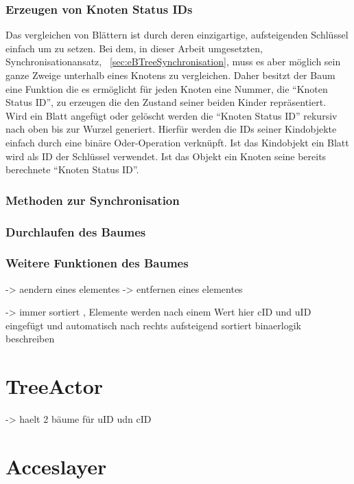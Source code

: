 \documentclass[a4paper,11pt,oneside,%
headsepline,												%
footsepline,												%
bibtotocnumbered									%
]{scrreprt}
\begin{document}
\subsubsection{Erzeugen von Knoten Status IDs}
Das vergleichen von Blättern ist durch deren einzigartige, aufsteigenden Schlüssel einfach um zu setzen. Bei dem, in dieser Arbeit umgesetzten, Synchronisationansatz, ~\autoref{sec:eBTreeSynchronisation}, muss es aber möglich sein ganze Zweige unterhalb eines Knotens zu vergleichen. Daher besitzt der Baum eine Funktion die es ermöglicht für jeden Knoten eine Nummer, die \enquote{Knoten Status ID}, zu erzeugen die den Zustand seiner beiden Kinder repräsentiert.\\

Wird ein Blatt angefügt oder gelöscht werden die \enquote{Knoten Status ID} rekursiv nach oben bis zur Wurzel generiert. Hierfür werden die IDs seiner Kindobjekte einfach durch eine binäre Oder-Operation verknüpft. Ist das Kindobjekt ein Blatt wird als ID der Schlüssel verwendet. Ist das Objekt ein Knoten seine bereits berechnete \enquote{Knoten Status ID}. 

\subsubsection{Methoden zur Synchronisation}

\subsubsection{Durchlaufen des Baumes}

\subsubsection{Weitere Funktionen des Baumes}
-> aendern eines elementes 
-> entfernen eines elementes


-> immer sortiert , Elemente werden nach einem Wert hier cID und uID eingefügt und automatisch nach rechts aufsteigend sortiert
binaerlogik beschreiben




	\section{TreeActor}
-> haelt 2 bäume für uID udn cID

\section{Acceslayer}
\end{document}
